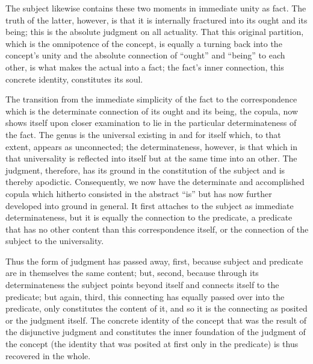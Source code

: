 The subject likewise contains
these two moments in immediate unity as fact.
The truth of the latter, however,
is that it is internally fractured
into its ought and its being;
this is the absolute judgment on all actuality.
That this original partition,
which is the omnipotence of the concept,
is equally a turning back into the concept's unity
and the absolute connection of “ought” and “being” to each other,
is what makes the actual into a fact;
the fact's inner connection,
this concrete identity, constitutes its soul.

The transition from the immediate simplicity of the fact
to the correspondence which is the determinate connection
of its ought and its being, the copula,
now shows itself upon closer examination
to lie in the particular determinateness of the fact.
The genus is the universal existing in and for itself
which, to that extent, appears as unconnected;
the determinateness, however, is that
which in that universality is reflected into itself
but at the same time into an other.
The judgment, therefore, has its ground
in the constitution of the subject
and is thereby apodictic.
Consequently, we now have
the determinate and accomplished copula
which hitherto consisted in the abstract “is”
but has now further developed into ground in general.
It first attaches to the subject as immediate determinateness,
but it is equally the connection to the predicate,
a predicate that has no other content than
this correspondence itself,
or the connection of the subject to the universality.

Thus the form of judgment has passed away,
first, because subject and predicate are
in themselves the same content;
but, second, because through its determinateness
the subject points beyond itself
and connects itself to the predicate;
but again, third, this connecting has
equally passed over into the predicate,
only constitutes the content of it,
and so it is the connecting as posited
or the judgment itself.
The concrete identity of the concept
that was the result of the disjunctive judgment
and constitutes the inner foundation of
the judgment of the concept
(the identity that was posited
at first only in the predicate)
is thus recovered in the whole.

